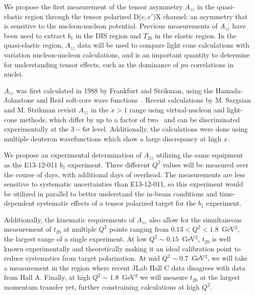 We propose the first measurement of the tensor asymmetry $A_{zz}$ in the quasi-elastic region through the tensor polarized D($e,e'$)X channel; an asymmetry that is sensitive to the nucleon-nucleon potential.  Previous measurements of $A_{zz}$ have been used to extract $b_1$ in the DIS region and $T_{20}$ in the elastic region. In the quasi-elastic region, $A_{zz}$ data will be used to compare light cone calculations with variation nucleon-nucleon calculations, and is an important quantity to determine for understanding tensor effects, such as the dominance of $pn$ correlations in nuclei.

$A_{zz}$ was first calculated in 1988 by Frankfurt and Strikman, using the Hamada-Johnstone and Reid soft-core wave functions~\cite{Frankfurt:1988nt}. Recent calculations by
M. Sargsian and M. Strikman revisit $A_{zz}$ in the $x > 1$ range using virtual-nucleon and light-cone methods, which differ by up to a factor of two~\cite{MISAK} and can be discriminated experimentally at the $3-6\sigma$ level. Additionally, the calculations were done using multiple deuteron wavefunctions which show a large discrepancy at high $x$.

We propose an experimental determination of $A_{zz}$  utilizing the same equipment as the E13-12-011 $b_1$ experiment.  Three different $Q^2$ values will be measured over the course of \productiondays days, with \overheaddays additional days of overhead. The measurements are less sensitive to systematic uncertainties than E13-12-011, so this experiment would be utilized in parallel to better understand the in-beam conditions and time-dependent systematic effects of a tensor polarized target for the $b_1$ experiment.

Additionally, the kinematic requirements of $A_{zz}$ also allow for the simultaneous measurement of $t_{20}$ at multiple $Q^2$ points ranging from $0.13<Q^2<1.8$~GeV$^2$, the largest range of a single experiment. At low $Q^2\sim0.15$~GeV$^2$, $t_{20}$ is well known experimentally and theoretically making it an ideal calibration point to reduce systematics from target polarization. At mid $Q^2\sim0.7$~GeV$^2$, we will take a measurement in the region where recent JLab Hall C data disagrees with data from Hall A. Finally, at high $Q^2\sim1.8$~GeV$^2$ we will measure $t_{20}$ at the largest momentum transfer yet, further constraining calculations at high $Q^2$.






